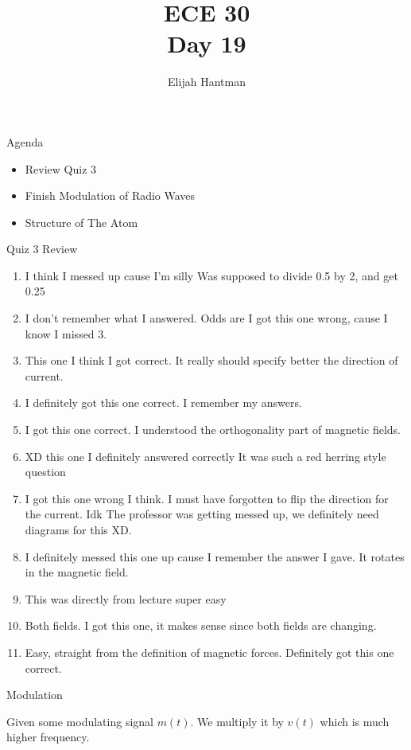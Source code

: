\documentclass{report}
\title{\Huge{ECE 30}\\Day 19}
\author{\huge{Elijah Hantman}}
\date{}
\begin{document}
\maketitle
\newpage

\begin{description}
    \item {\large Agenda} 
        \begin{itemize}
            \item Review Quiz 3
            \item Finish Modulation of Radio Waves
            \item Structure of The Atom
        \end{itemize}
    \item {\large Quiz 3 Review}
        \begin{mdframed}
           \begin{enumerate}
               \item I think I messed up cause I'm silly
                   Was supposed to divide 0.5 by 2, and get 0.25
               \item I don't remember what I answered. Odds are I got
                   this one wrong, cause I know I missed 3.
               \item This one I think I got correct. It really
                   should specify better the direction of current.
               \item I definitely got this one correct. I remember my answers.
               \item I got this one correct. I understood the
                   orthogonality part of magnetic fields.
               \item XD this one I definitely answered correctly
                   It was such a red herring style question
               \item I got this one wrong I think. I must have
                   forgotten to flip the direction for
                   the current. Idk The professor was getting
                   messed up, we definitely need diagrams for
                   this XD.
               \item I definitely messed this one up cause
                   I remember the answer I gave. It rotates
                   in the magnetic field.
               \item This was directly from lecture super easy
               \item Both fields. I got this one, it makes
                   sense since both fields are changing.
               \item Easy, straight from the definition of
                   magnetic forces. Definitely got this
                   one correct.
           \end{enumerate} 
        \end{mdframed}
    \item {\large Modulation}
        \begin{mdframed}
            Given some modulating signal $m(t)$. 
            We multiply it by $v(t)$ which is much higher
            frequency.


\end{mdframed}
\end{description}
\end{document}
